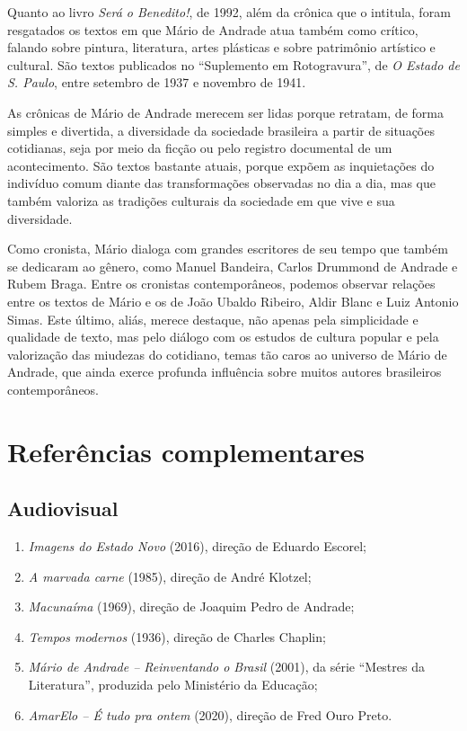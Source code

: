 \documentclass[12pt]{extarticle}
\begin{document}
Quanto ao livro \emph{Será o Benedito!}, de 1992, além da crônica que o
intitula, foram resgatados os textos em que Mário de Andrade atua
também como crítico, falando sobre pintura, literatura, artes plásticas
e sobre patrimônio artístico e cultural. São textos publicados no ``Suplemento
em Rotogravura'', de \emph{O Estado de S. Paulo}, entre setembro de 1937
e novembro de 1941.

As crônicas de Mário de Andrade merecem ser lidas porque retratam, de
forma simples e divertida, a diversidade da sociedade brasileira a
partir de situações cotidianas, seja por meio da ficção ou pelo registro
documental de um acontecimento. São textos bastante atuais, porque
expõem as inquietações do indivíduo comum diante das transformações
observadas no dia a dia, mas que também valoriza as tradições culturais
da sociedade em que vive e sua diversidade.

Como cronista, Mário dialoga com grandes escritores de seu tempo que
também se dedicaram ao gênero, como Manuel Bandeira, Carlos Drummond de
Andrade e Rubem Braga. Entre os cronistas contemporâneos, podemos
observar relações entre os textos de Mário e os de João Ubaldo Ribeiro,
Aldir Blanc e Luiz Antonio Simas. Este último, aliás, merece destaque, não
apenas pela simplicidade e qualidade de texto, mas pelo diálogo com os
estudos de cultura popular e pela valorização das miudezas do cotidiano,
temas tão caros ao universo de Mário de Andrade, que ainda exerce
profunda influência sobre muitos autores brasileiros contemporâneos.




\section{Referências complementares}

\subsection{Audiovisual}

\begin{enumerate}
\item
  \emph{Imagens do Estado Novo} (2016), direção de Eduardo Escorel;
\item
  \emph{A marvada carne} (1985), direção de André Klotzel;
\item
  \emph{Macunaíma} (1969), direção de Joaquim Pedro de Andrade;
\item
  \emph{Tempos modernos} (1936), direção de Charles Chaplin;
\item
  \emph{Mário de Andrade -- Reinventando o Brasil} (2001), da série
  ``Mestres da Literatura'', produzida pelo Ministério da Educação;
\item
  \emph{AmarElo -- É tudo pra ontem} (2020), direção de Fred Ouro Preto.
\end{enumerate}
\end{document}

